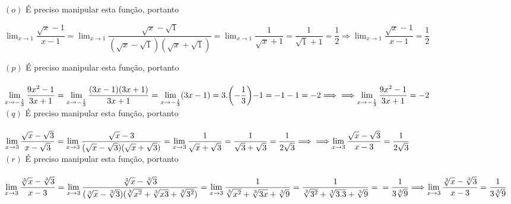 \documentclass[12pt,openright,twoside,a4paper]{article}
\theoremstyle{definition}
\begin{document}
		$(o)$ É preciso manipular esta função, portanto \begin{center}$\displaystyle{\lim_{x \to 1} \dfrac{\sqrt{x} - 1}{x - 1}} = \displaystyle{\lim_{x \to 1} \dfrac{\sqrt{x} - \sqrt{1}}{(\sqrt{x} - \sqrt{1})(\sqrt{x} + \sqrt{1})}} = \displaystyle{\lim_{x \to 1} \dfrac{1}{\sqrt{x} + 1}} = \dfrac{1}{\sqrt{1} + 1} = \dfrac{1}{2} \Rightarrow \displaystyle{\lim_{x \to 1} \dfrac{\sqrt{x} - 1}{x - 1}} = \dfrac{1}{2}$\end{center}
		
		$(p)$ É preciso manipular esta função, portanto \\ \\ $\displaystyle{\lim_{x \to -\frac{1}{3}} \dfrac{9x^{2} - 1}{3x + 1}} = \displaystyle{\lim_{x \to -\frac{1}{3}} \dfrac{(3x - 1)(3x + 1)}{3x + 1}} = \displaystyle{\lim_{x \to -\frac{1}{3}} (3x - 1)} = 3.\biggl(-\dfrac{1}{3}\biggl) - 1 = -1 - 1 = -2 \Longrightarrow \\ \\ \\ \Longrightarrow \displaystyle{\lim_{x \to -\frac{1}{3}} \dfrac{9x^{2} - 1}{3x + 1}} = -2$ \\
		
		$(q)$ É preciso manipular esta função, portanto \\ \\ $\displaystyle{\lim_{x \to 3} \dfrac{\sqrt{x} - \sqrt{3}}{x - \sqrt{3}}} = \displaystyle{\lim_{x \to 3} \dfrac{\sqrt{x} - 3}{(\sqrt{x} - \sqrt{3})(\sqrt{x} + \sqrt{3})}} = \displaystyle{\lim_{x \to 3} \dfrac{1}{\sqrt{x} + \sqrt{3}}} = \dfrac{1}{\sqrt{3} + \sqrt{3}} = \dfrac{1}{2\sqrt{3}} \Longrightarrow \\ \\ \\ \Longrightarrow \displaystyle{\lim_{x \to 3} \dfrac{\sqrt{x} - \sqrt{3}}{x - 3}} = \dfrac{1}{2\sqrt{3}}$ \\
		
		$(r)$ É preciso manipular esta função, portanto \\ \\ $\displaystyle{\lim_{x \to 3} \dfrac{\sqrt[3]{x} - \sqrt[3]{3}}{x - 3}} = \displaystyle{\lim_{x \to 3} \dfrac{\sqrt[3]{x} - \sqrt[3]{3}}{(\sqrt[3]{x} - \sqrt[3]{3})(\sqrt[3]{x^2} + \sqrt[3]{x3} + \sqrt[3]{3^{2}})}} = \displaystyle{\lim_{x \to 3} \dfrac{1}{\sqrt[3]{x^2} + \sqrt[3]{3x} + \sqrt[3]{9}}} = \dfrac{1}{\sqrt[3]{3^2} + \sqrt[3]{3.3} + \sqrt[3]{9}} = \\ \\ \\ = \dfrac{1}{3\sqrt[3]{9}} \Longrightarrow \displaystyle{\lim_{x \to 3} \dfrac{\sqrt[3]{x} - \sqrt[3]{3}}{x - 3}} = \dfrac{1}{3\sqrt[3]{9}}$ \\
		
\end{document}
